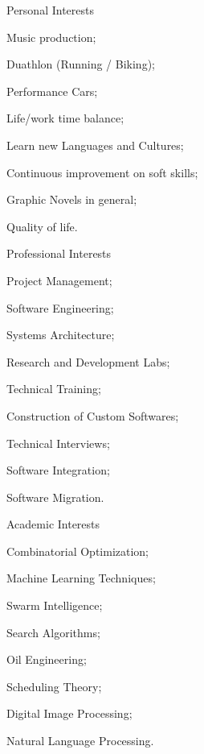\noindent
\vspace{-0.3cm}
\begin{multicols*}{3}
\begin{cventries}
\noindent
\cventry
   {Personal Interests}{}{}{}
   {
     \begin{cvitems}
       \item Music production;
       \item Duathlon (Running / Biking);
       \item Performance Cars;
       \item Life/work time balance;
       \item Learn new Languages and Cultures;
       \item Continuous improvement on soft skills;
       \item Graphic Novels in general;
       \item Quality of life.
       \end{cvitems}
   }
\end{cventries}
\columnbreak
\begin{cventries}
\noindent
\cventry
    {Professional Interests}{}{}{}
    {
      \begin{cvitems}
        \item Project Management;
        \item Software Engineering;
        \item Systems Architecture;
        \item Research and Development Labs;
        \item Technical Training;
        \item Construction of Custom Softwares;
        \item Technical Interviews;
        \item Software Integration;
        \item Software Migration.
      \end{cvitems}
    }
\end{cventries}
\columnbreak
\begin{cventries}
\noindent
\cventry
    {Academic Interests}{}{}{}
    {
      \begin{cvitems}
        \item Combinatorial Optimization;
        \item Machine Learning Techniques;
        \item Swarm Intelligence;
        \item Search Algorithms;
        \item Oil Engineering;
        \item Scheduling Theory;
        \item Digital Image Processing;
        \item Natural Language Processing.
      \end{cvitems}
    }
\end{cventries}
\end{multicols*}
